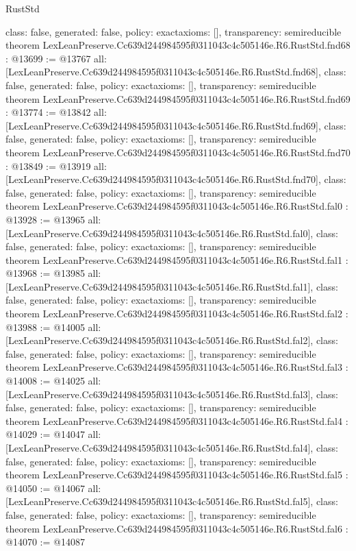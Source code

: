 \begin{lexlean}{RustStd}
\begin{coremodule}
{  class: false,
  generated: false,
  policy: exact{axioms: []},
  transparency: semireducible
}
theorem LexLeanPreserve.Cc639d244984595f0311043c4c505146e.R6.RustStd.fnd68 : @13699 := @13767 {
  all: [LexLeanPreserve.Cc639d244984595f0311043c4c505146e.R6.RustStd.fnd68],
  class: false,
  generated: false,
  policy: exact{axioms: []},
  transparency: semireducible
}
theorem LexLeanPreserve.Cc639d244984595f0311043c4c505146e.R6.RustStd.fnd69 : @13774 := @13842 {
  all: [LexLeanPreserve.Cc639d244984595f0311043c4c505146e.R6.RustStd.fnd69],
  class: false,
  generated: false,
  policy: exact{axioms: []},
  transparency: semireducible
}
theorem LexLeanPreserve.Cc639d244984595f0311043c4c505146e.R6.RustStd.fnd70 : @13849 := @13919 {
  all: [LexLeanPreserve.Cc639d244984595f0311043c4c505146e.R6.RustStd.fnd70],
  class: false,
  generated: false,
  policy: exact{axioms: []},
  transparency: semireducible
}
theorem LexLeanPreserve.Cc639d244984595f0311043c4c505146e.R6.RustStd.fal0 : @13928 := @13965 {
  all: [LexLeanPreserve.Cc639d244984595f0311043c4c505146e.R6.RustStd.fal0],
  class: false,
  generated: false,
  policy: exact{axioms: []},
  transparency: semireducible
}
theorem LexLeanPreserve.Cc639d244984595f0311043c4c505146e.R6.RustStd.fal1 : @13968 := @13985 {
  all: [LexLeanPreserve.Cc639d244984595f0311043c4c505146e.R6.RustStd.fal1],
  class: false,
  generated: false,
  policy: exact{axioms: []},
  transparency: semireducible
}
theorem LexLeanPreserve.Cc639d244984595f0311043c4c505146e.R6.RustStd.fal2 : @13988 := @14005 {
  all: [LexLeanPreserve.Cc639d244984595f0311043c4c505146e.R6.RustStd.fal2],
  class: false,
  generated: false,
  policy: exact{axioms: []},
  transparency: semireducible
}
theorem LexLeanPreserve.Cc639d244984595f0311043c4c505146e.R6.RustStd.fal3 : @14008 := @14025 {
  all: [LexLeanPreserve.Cc639d244984595f0311043c4c505146e.R6.RustStd.fal3],
  class: false,
  generated: false,
  policy: exact{axioms: []},
  transparency: semireducible
}
theorem LexLeanPreserve.Cc639d244984595f0311043c4c505146e.R6.RustStd.fal4 : @14029 := @14047 {
  all: [LexLeanPreserve.Cc639d244984595f0311043c4c505146e.R6.RustStd.fal4],
  class: false,
  generated: false,
  policy: exact{axioms: []},
  transparency: semireducible
}
theorem LexLeanPreserve.Cc639d244984595f0311043c4c505146e.R6.RustStd.fal5 : @14050 := @14067 {
  all: [LexLeanPreserve.Cc639d244984595f0311043c4c505146e.R6.RustStd.fal5],
  class: false,
  generated: false,
  policy: exact{axioms: []},
  transparency: semireducible
}
theorem LexLeanPreserve.Cc639d244984595f0311043c4c505146e.R6.RustStd.fal6 : @14070 := @14087 {
}
\end{coremodule}
\end{lexlean}
